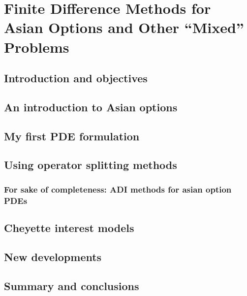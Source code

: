 \chapter{Finite Difference Methods for Asian Options and Other ``Mixed'' Problems}

\section{Introduction and objectives}

\section{An introduction to Asian options}

\section{My first PDE formulation}

\section{Using operator splitting methods}

\subsection{For sake of completeness: ADI methods for asian option PDEs}

\section{Cheyette interest models}

\section{New developments}

\section{Summary and conclusions}